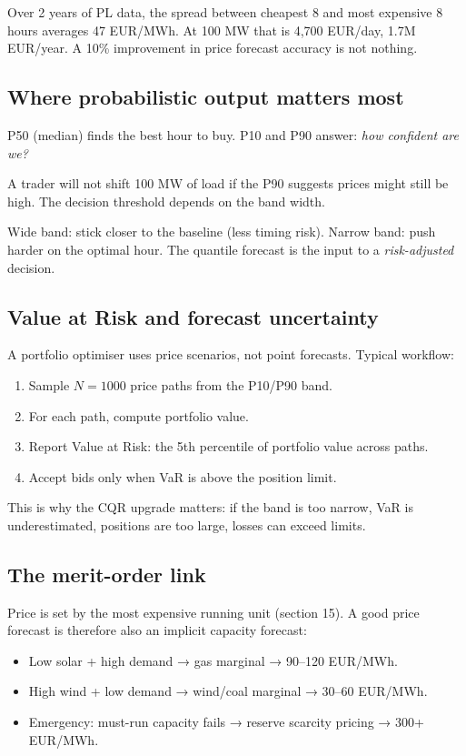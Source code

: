 Over 2 years of PL data, the spread between cheapest 8 and most expensive 8
hours averages 47 EUR/MWh. At 100 MW that is 4,700 EUR/day, 1.7M EUR/year.
A 10\% improvement in price forecast accuracy is not nothing.

\subsection{Where probabilistic output matters most}

P50 (median) finds the best hour to buy.
P10 and P90 answer: \emph{how confident are we?}

A trader will not shift 100 MW of load if the P90 suggests prices
might still be high. The decision threshold depends on the band width.

Wide band: stick closer to the baseline (less timing risk).
Narrow band: push harder on the optimal hour.
The quantile forecast is the input to a \emph{risk-adjusted} decision.

\subsection{Value at Risk and forecast uncertainty}

A portfolio optimiser uses price scenarios, not point forecasts.
Typical workflow:

\begin{enumerate}
  \item Sample $N=1000$ price paths from the P10/P90 band.
  \item For each path, compute portfolio value.
  \item Report Value at Risk: the 5th percentile of portfolio value across paths.
  \item Accept bids only when VaR is above the position limit.
\end{enumerate}

This is why the CQR upgrade matters: if the band is too narrow,
VaR is underestimated, positions are too large, losses can exceed limits.

\subsection{The merit-order link}

Price is set by the most expensive running unit (section 15).
A good price forecast is therefore also an implicit capacity forecast:

\begin{itemize}
  \item Low solar + high demand → gas marginal → 90--120 EUR/MWh.
  \item High wind + low demand → wind/coal marginal → 30--60 EUR/MWh.
  \item Emergency: must-run capacity fails → reserve scarcity pricing → 300+ EUR/MWh.
\end{itemize}

